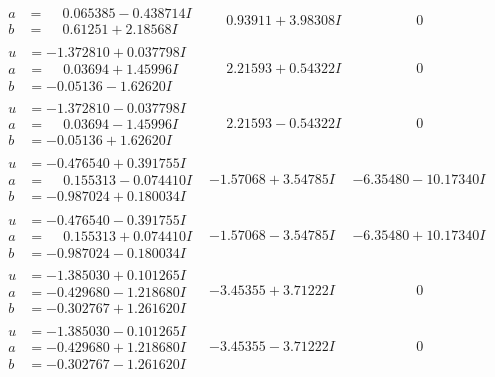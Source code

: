 \documentclass[1p]{elsarticle_modified}
\theoremstyle{definition}
\begin{document}
$$\begin{array}{c|c|c}
\begin{aligned}
a &= \phantom{-}0.065385 - 0.438714 I \\
b &= \phantom{-}0.61251 + 2.18568 I\end{aligned}
 & \phantom{-}0.93911 + 3.98308 I & \phantom{-0.000000 } 0 \\ \hline\begin{aligned}
u &= -1.372810 + 0.037798 I \\
a &= \phantom{-}0.03694 + 1.45996 I \\
b &= -0.05136 - 1.62620 I\end{aligned}
 & \phantom{-}2.21593 + 0.54322 I & \phantom{-0.000000 } 0 \\ \hline\begin{aligned}
u &= -1.372810 - 0.037798 I \\
a &= \phantom{-}0.03694 - 1.45996 I \\
b &= -0.05136 + 1.62620 I\end{aligned}
 & \phantom{-}2.21593 - 0.54322 I & \phantom{-0.000000 } 0 \\ \hline\begin{aligned}
u &= -0.476540 + 0.391755 I \\
a &= \phantom{-}0.155313 - 0.074410 I \\
b &= -0.987024 + 0.180034 I\end{aligned}
 & -1.57068 + 3.54785 I & -6.35480 - 10.17340 I \\ \hline\begin{aligned}
u &= -0.476540 - 0.391755 I \\
a &= \phantom{-}0.155313 + 0.074410 I \\
b &= -0.987024 - 0.180034 I\end{aligned}
 & -1.57068 - 3.54785 I & -6.35480 + 10.17340 I \\ \hline\begin{aligned}
u &= -1.385030 + 0.101265 I \\
a &= -0.429680 - 1.218680 I \\
b &= -0.302767 + 1.261620 I\end{aligned}
 & -3.45355 + 3.71222 I & \phantom{-0.000000 } 0 \\ \hline\begin{aligned}
u &= -1.385030 - 0.101265 I \\
a &= -0.429680 + 1.218680 I \\
b &= -0.302767 - 1.261620 I\end{aligned}
 & -3.45355 - 3.71222 I & \phantom{-0.000000 } 0 \\ \hline\begin{aligned}

\end{aligned}
\end{array}$$
\end{document}
